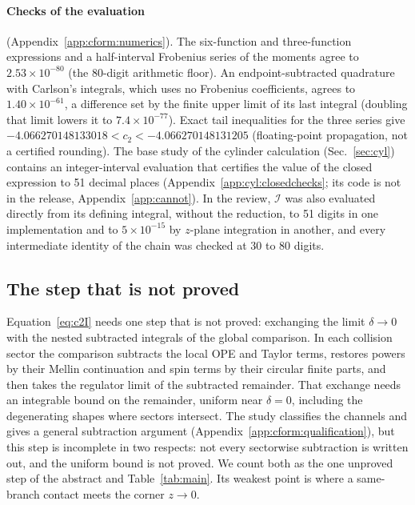 \documentclass[11pt,a4paper]{article}
\numberwithin{equation}{section}
\newcommand{\cI}{\mathcal I}
\newcommand{\sci}[2]{#1\times10^{#2}}
\begin{document}
\paragraph{Checks of the evaluation} (Appendix~\ref{app:cform:numerics}). The six-function and three-function expressions and a half-interval Frobenius
series of the moments agree to $\sci{2.53}{-80}$ (the 80-digit arithmetic floor). An endpoint-subtracted quadrature with
Carlson's integrals, which uses no Frobenius coefficients, agrees to $\sci{1.40}{-61}$, a difference set by the
finite upper limit of its last integral (doubling that limit lowers it to $\sci{7.4}{-77}$). Exact tail inequalities for the three
series give $-4.066270148133018<c_2<-4.066270148131205$ (floating-point propagation, not a certified rounding). The
base study of the cylinder calculation (Sec.~\ref{sec:cyl}) contains an integer-interval evaluation that certifies the
value of the closed expression to 51 decimal places (Appendix~\ref{app:cyl:closedchecks}; its code is not in the
release, Appendix~\ref{app:cannot}). In the review, $\cI$ was also evaluated directly from its defining integral, without
the reduction, to 51 digits in one implementation and to $\sci{5}{-15}$ by $z$-plane integration in another, and every
intermediate identity of the chain was checked at 30 to 80 digits.

\subsection{The step that is not proved}\label{sec:unproved}
Equation~\eqref{eq:c2I} needs one step that is not proved: exchanging the limit $\delta\to0$ with the nested
subtracted integrals of the global comparison. In each collision sector the comparison subtracts the local OPE and
Taylor terms, restores powers by their Mellin continuation and spin terms by their circular finite parts, and then
takes the regulator limit of the subtracted remainder. That exchange needs an integrable bound on the remainder,
uniform near $\delta=0$, including the degenerating shapes where sectors intersect. The study classifies the channels
and gives a general subtraction argument (Appendix~\ref{app:cform:qualification}), but this step is incomplete in two
respects: not every sectorwise
subtraction is written out, and the uniform bound is not proved. We count both as the one unproved step of the
abstract and Table~\ref{tab:main}. Its weakest point is where a same-branch contact meets the corner $z\to0$.
\end{document}
